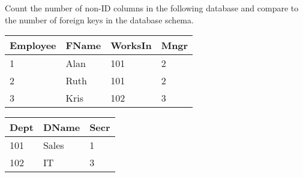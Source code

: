 Count the number of non-ID columns in the following database and compare to the number of foreign keys in the database schema.

    \begin{minipage}{0.48\textwidth}

      \begin{tabular}{|l|l|l|l|}
        \hline
        Employee & FName & WorksIn & Mngr \\ \hline
        1        & Alan  & 101     & 2    \\ \hline
        2        & Ruth  & 101     & 2    \\ \hline
        3        & Kris  & 102     & 3    \\ \hline
      \end{tabular}
    \end{minipage}

    \begin{minipage}{0.48\textwidth}

      \begin{tabular}{|l|l|l|}
        \hline
        Dept & DName & Secr \\ \hline
        101  & Sales & 1    \\
        102  & IT    & 3    \\
      \end{tabular}
    \end{minipage}


